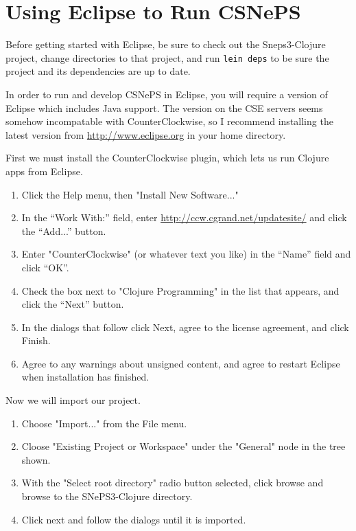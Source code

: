 \documentclass[letterpaper,colorlinks=true,linkcolor=blue]{book}
\begin{document}
\section{Using Eclipse to Run CSNePS}

Before getting started with Eclipse, be sure to check out the Sneps3-Clojure project, change directories to that project, and run \texttt{lein deps} to be sure the project and its dependencies are up to date.

In order to run and develop CSNePS in Eclipse, you will require a version of Eclipse which includes Java support. The version on the CSE servers seems somehow incompatable with CounterClockwise, so I recommend installing the latest version from \url{http://www.eclipse.org} in your home directory.

First we must install the CounterClockwise plugin, which lets us run Clojure apps from Eclipse.

\begin{enumerate}
  \item Click the Help menu, then "Install New Software..."
  \item In the ``Work With:'' field, enter \url{http://ccw.cgrand.net/updatesite/} and click the ``Add...'' button.
  \item Enter "CounterClockwise" (or whatever text you like) in the ``Name'' field and click ``OK''.
  \item Check the box next to "Clojure Programming" in the list that appears, and click the ``Next'' button.
  \item In the dialogs that follow click Next, agree to the license agreement, and click Finish.
  \item Agree to any warnings about unsigned content, and agree to restart Eclipse when installation has finished.
\end{enumerate}

Now we will import our project. 

\begin{enumerate}
  \item Choose "Import..." from the File menu.
  \item Cloose "Existing Project or Workspace" under the "General" node in the tree shown.
  \item With the "Select root directory" radio button selected, click browse and browse to the SNePS3-Clojure directory.
  \item Click next and follow the dialogs until it is imported.
\end{enumerate}
\end{document}
